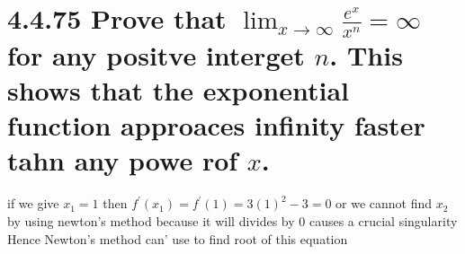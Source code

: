 \section*{4.4.75
    \textbf{
        Prove that
        $
        \lim_{x \to \infty} \frac{e^x}{x^n} = \infty
        $
        for any positve interget $n$. This shows that the exponential function approaces infinity faster tahn any powe rof $x$.
    }
}

if we give $x_1 = 1$ then $f^{'}(x_1) = f^{'}(1) = 3(1)^2 - 3 = 0$
or we cannot find $x_2$ by using newton's method because it will divides by 0 causes a crucial singularity
\\
Hence Newton's method can' use to find root of this equation
